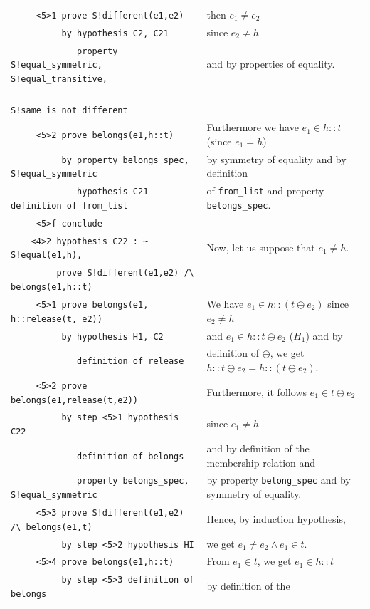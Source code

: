 \documentclass[submission,copyright,creativecommons]{eptcs}
\begin{document}
\begin{table}
\begin{center}
{\begin{tabular}{|ll|}
\verb+     <5>1 prove S!different(e1,e2)+ & then $e_1 \neq e_2$ \\
\verb+          by hypothesis C2, C21+ & since $e_2 \neq h$\\
\verb+             property S!equal_symmetric, S!equal_transitive,+ &
and by properties of equality.\\
\verb+                      S!same_is_not_different+ & \\
\verb+     <5>2 prove belongs(e1,h::t)+ & Furthermore we have $e_1 \in h::t$
(since $e_1=h$) \\
\verb+          by property belongs_spec, S!equal_symmetric+ & by
symmetry of equality and by definition\\
\verb+             hypothesis C21 definition of from_list+ & 
of
\verb+from_list+ and property
\verb+belongs_spec+.
\\
\verb+     <5>f conclude+ & \\
\verb+    <4>2 hypothesis C22 : ~ S!equal(e1,h),+ & Now, let us
suppose that $e_1 \neq h$.\\
\verb+         prove S!different(e1,e2) /\ belongs(e1,h::t)+ & \\
\verb+     <5>1 prove belongs(e1, h::release(t, e2))+ & We have $e_1
\in h::(t \ominus e_2)$ since $e_2 \neq h$\\
\verb+          by hypothesis H1, C2+ & 
and $e_1
\in h::t \ominus e_2$ ($H_1$) and by\\
\verb+             definition of release+ & definition of $\ominus$,
we get
$h::t \ominus e_2 = h::(t \ominus e_2)$.
\\
\verb+     <5>2 prove belongs(e1,release(t,e2))+ & Furthermore, it follows
 $e_1 \in t \ominus e_2$\\
\verb+          by step <5>1 hypothesis C22+ & since $e_1 \neq h$\\
\verb+             definition of belongs+ & and by definition of the
membership relation and \\
\verb+             property belongs_spec, S!equal_symmetric+ &
by property \verb+belong_spec+ and by symmetry of equality. \\
\verb+     <5>3 prove S!different(e1,e2) /\ belongs(e1,t)+ & 
Hence, by induction hypothesis, \\
\verb+          by step <5>2 hypothesis HI+ & we get $e_1 \neq e_2
\land e_1 \in t$.\\
\verb+     <5>4 prove belongs(e1,h::t)+ & 
From $e_1 \in t$, we get $e_1 \in h::t$
\\
\verb+          by step <5>3 definition of belongs+ &  by definition of the

\end{tabular}}
\end{center}
\end{table}
\end{document}
